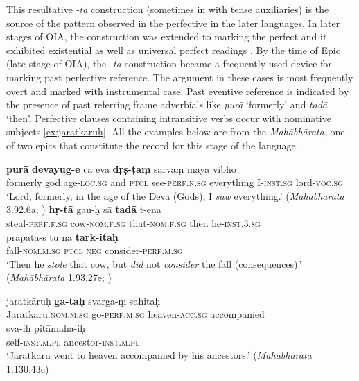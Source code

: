 \documentclass[output=paper,
modfonts
]{LSP/langsci}
\begin{document}
This  resultative \textit{-ta} construction (sometimes in  with tense auxiliaries)  is the source of
the  pattern observed in the perfective  in the later
languages.  In later stages of OIA, the construction was extended to
marking the perfect  and it exhibited existential as well as
universal perfect readings \citep{condoravdideo14}.  By the time of
Epic  (late stage of OIA), the \textit{-ta}
construction became a frequently used device for marking past
perfective reference. The  argument in these cases is most
frequently overt and marked with instrumental case.   Past eventive reference is indicated
by the presence of past referring frame adverbials like \textit{purā}
`formerly' and \textit{tadā} `then'. Perfective clauses containing intransitive verbs occur with nominative subjects \cref{ex:jaratkaruh}. All the examples below are from the \textit{Mahābhārata}, one of two epics that constitute the record for this stage of the language.

\begin{exe}
\ex\label{ex:ghi}
\begin{xlist}
\ex\label{ex:pura} \gll \textbf{purā}  \textbf{ devayug-e}   ca  eva  \textbf{dṛṣ-ṭaṃ}    sarvaṃ  mayā  vibho\\
formerly  god.age-\textsc{loc.sg}  and  \textsc{ptcl}  see-\textsc{perf.n.sg}  everything I-\textsc{inst.sg}  lord-\textsc{voc.sg}\\
\glt `Lord, formerly, in the age of the Deva (Gods), I \textit{saw} everything.' (\textit{Mahābhārata} 3.92.6a; \citealt{deo2012})
\ex\label{ex:hrta} \gll \textbf{hṛ-tā}  gau-ḥ   sā  \textbf{tadā} t-ena  \\
steal-\textsc{perf.f.sg}  cow-\textsc{nom.f.sg}  that-\textsc{nom.f.sg}  then   he-\textsc{inst.3.sg} \\

\gll prapāta-s   tu  na  \textbf{tark-itaḥ}\\
fall-\textsc{nom.m.sg}  \textsc{ptcl}  \textsc{neg}  consider-\textsc{perf.m.sg}\\
\glt `Then he \textit{stole} that cow, but \textit{did} not \textit{consider} the
fall (consequences).' (\textit{Mahābhārata} 1.93.27e; \citealt{deo2012})

\ex\label{ex:jaratkaruh}\gll jaratkāruḥ \textbf{ga-taḥ} svarga-ṃ sahitaḥ \\
Jaratkāru.\textsc{nom.m.sg} go-\textsc{perf.m.sg} heaven-\textsc{acc.sg} accompanied \\

\gll sva-iḥ pitāmaha-iḥ \\
self-\textsc{inst.m.pl}  ancestor-\textsc{inst.m.pl} \\
\glt `Jaratkāru went to heaven accompanied by his ancestors.' (\textit{Mahābhārata} 1.130.43c)
\end{xlist}
\end{exe}
\end{document}
